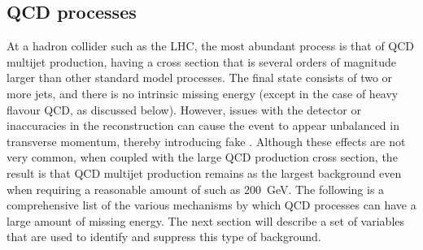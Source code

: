 \subsection{QCD processes}


At a hadron collider such as the LHC, the most abundant process is 
that of QCD multijet production, having a cross section that is several orders 
of magnitude larger than other standard model processes. The final 
state consists of two or more jets, and there is no intrinsic missing energy 
(except in the case of heavy flavour QCD, as discussed below). However, issues 
with the detector or inaccuracies in the reconstruction 
can cause the event to appear 
unbalanced in transverse momentum, thereby introducing fake \met. Although 
these effects are not very common, when coupled with the large QCD production 
cross section, the result is that QCD multijet production remains as the 
largest background even when requiring a reasonable amount of \met such as 
200~GeV. The following is a comprehensive list of the various mechanisms by 
which QCD processes can have a large amount of missing energy. The 
next section will describe a set of variables that are used to identify and 
suppress this type of background.

